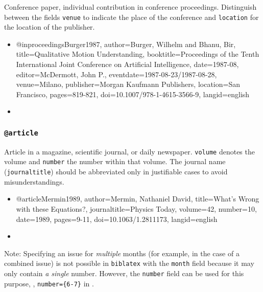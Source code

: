 Conference paper, individual contribution in conference proceedings. Distinguish
between the fields \texttt{venue} to indicate the place of the conference and
\texttt{location} for the location of the publisher.
%
\begin{itemize}
\item[]
\begin{GenericCode}[numbers=none]
@inproceedings{Burger1987,
  author={Burger, Wilhelm and Bhanu, Bir},
  title={Qualitative Motion Understanding},
  booktitle={Proceedings of the Tenth International Joint Conference on Artificial Intelligence},
  date={1987-08},
  editor={McDermott, John P.},
  eventdate={1987-08-23/1987-08-28},
  venue={Milano},
  publisher={Morgan Kaufmann Publishers},
  location={San Francisco},
  pages={819-821},
  doi={10.1007/978-1-4615-3566-9},
  langid={english}
}
\end{GenericCode}
\item[\cite{Burger1987}] 
\end{itemize}


\subsubsection{\texttt{\bfseries @article}}
\label{sec:@article}

Article in a magazine, scientific journal, or daily newspaper. \texttt{volume}
denotes the volume and \texttt{number} the number within that volume. The
journal name (\texttt{journaltitle}) should be abbreviated only in justifiable
cases to avoid misunderstandings.
%
\begin{itemize}
\item[]
\begin{GenericCode}[numbers=none]
@article{Mermin1989,
  author={Mermin, Nathaniel David},
  title={What's Wrong with these Equations?},
  journaltitle={Physics Today},
  volume={42},
  number={10},
  date={1989},
  pages={9-11},
  doi={10.1063/1.2811173},
  langid={english}
}
\end{GenericCode}
\item[\cite{Mermin1989}] 
\end{itemize}
%
Note: Specifying an issue for \emph{multiple} months (for example, in the
case of a combined issue) is not possible in \texttt{biblatex} with the
\texttt{month} field because it may only contain \emph{a single} number.
However, the \texttt{number} field can be used for this purpose, \eg,
\texttt{number=\{6-7\}} in \cite{Vardavoulia2001}.

